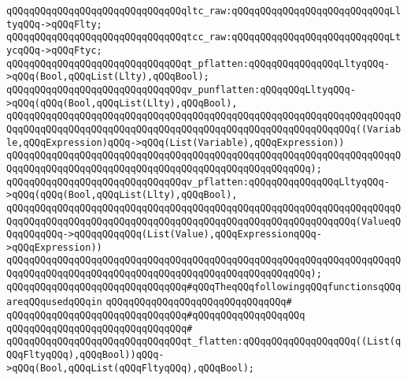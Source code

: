 \verb|qQQqqQQqqQQqqQQqqQQqqQQqqQQqqQQqltc_raw:qQQqqQQqqQQqqQQqqQQqqQQqqQQqLltyqQQq->qQQqFlty;|\newline
\verb|qQQqqQQqqQQqqQQqqQQqqQQqqQQqqQQqtcc_raw:qQQqqQQqqQQqqQQqqQQqqQQqqQQqLtycqQQq->qQQqFtyc;|\newline
\newline
\verb|qQQqqQQqqQQqqQQqqQQqqQQqqQQqqQQqt_pflatten:qQQqqQQqqQQqqQQqLltyqQQq->qQQq(Bool,qQQqList(Llty),qQQqBool);|\newline
\newline
\verb|qQQqqQQqqQQqqQQqqQQqqQQqqQQqqQQqv_punflatten:qQQqqQQqLltyqQQq->qQQq(qQQq(Bool,qQQqList(Llty),qQQqBool),|\newline
\verb|qQQqqQQqqQQqqQQqqQQqqQQqqQQqqQQqqQQqqQQqqQQqqQQqqQQqqQQqqQQqqQQqqQQqqQQqqQQqqQQqqQQqqQQqqQQqqQQqqQQqqQQqqQQqqQQqqQQqqQQqqQQqqQQqqQQq((Variable,qQQqExpression)qQQq->qQQq(List(Variable),qQQqExpression))|\newline
\verb|qQQqqQQqqQQqqQQqqQQqqQQqqQQqqQQqqQQqqQQqqQQqqQQqqQQqqQQqqQQqqQQqqQQqqQQqqQQqqQQqqQQqqQQqqQQqqQQqqQQqqQQqqQQqqQQqqQQqqQQqqQQq);|\newline
\newline
\verb|qQQqqQQqqQQqqQQqqQQqqQQqqQQqqQQqv_pflatten:qQQqqQQqqQQqqQQqLltyqQQq->qQQq(qQQq(Bool,qQQqList(Llty),qQQqBool),|\newline
\verb|qQQqqQQqqQQqqQQqqQQqqQQqqQQqqQQqqQQqqQQqqQQqqQQqqQQqqQQqqQQqqQQqqQQqqQQqqQQqqQQqqQQqqQQqqQQqqQQqqQQqqQQqqQQqqQQqqQQqqQQqqQQqqQQqqQQq(ValueqQQqqQQqqQQq->qQQqqQQqqQQq(List(Value),qQQqExpressionqQQq->qQQqExpression))|\newline
\verb|qQQqqQQqqQQqqQQqqQQqqQQqqQQqqQQqqQQqqQQqqQQqqQQqqQQqqQQqqQQqqQQqqQQqqQQqqQQqqQQqqQQqqQQqqQQqqQQqqQQqqQQqqQQqqQQqqQQqqQQqqQQq);|\newline
\newline
\verb|qQQqqQQqqQQqqQQqqQQqqQQqqQQqqQQq#qQQqTheqQQqfollowingqQQqfunctionsqQQqareqQQqusedqQQqin|\newline
\verb|qQQqqQQqqQQqqQQqqQQqqQQqqQQqqQQq#|\newline
\verb|qQQqqQQqqQQqqQQqqQQqqQQqqQQqqQQq#qQQqqQQqqQQqqQQqqQQq|\newline
\verb|qQQqqQQqqQQqqQQqqQQqqQQqqQQqqQQq#|\newline
\verb|qQQqqQQqqQQqqQQqqQQqqQQqqQQqqQQqt_flatten:qQQqqQQqqQQqqQQqqQQq((List(qQQqFltyqQQq),qQQqBool))qQQq->qQQq(Bool,qQQqList(qQQqFltyqQQq),qQQqBool);|\newline
